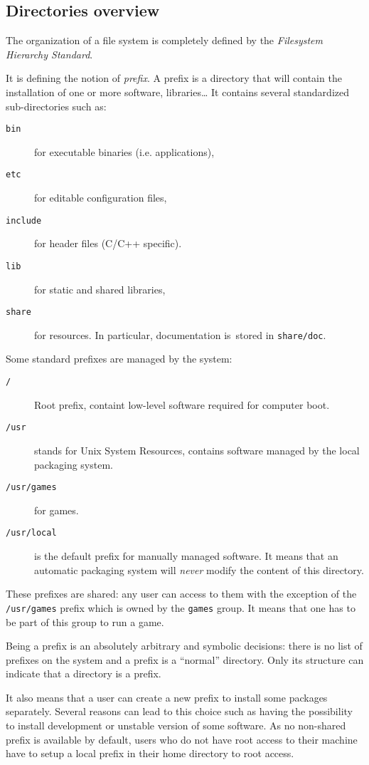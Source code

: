 \subsection{\linux Directories overview}

The organization of a \linux file system is completely defined by the
\emph{Filesystem Hierarchy Standard}.

It is defining the notion of \emph{prefix}. A prefix is a directory
that will contain the installation of one or more software,
libraries\ldots
It contains several standardized sub-directories such as:
\begin{description}
  \item[\texttt{bin}] for executable binaries (i.e. applications),
  \item[\texttt{etc}] for editable configuration files,
  \item[\texttt{include}] for header files (C/C++ specific).
  \item[\texttt{lib}] for static and shared libraries,
  \item[\texttt{share}] for resources. In particular, documentation is\
    stored in \texttt{share/doc}.
\end{description}

Some standard prefixes are managed by the system:
\begin{description}
\item[\texttt{/}] Root prefix, containt low-level software required
  for computer boot.
\item[\texttt{/usr}] stands for Unix System Resources, contains
  software managed by the local packaging system.
\item[\texttt{/usr/games}] for games.
\item[\texttt{/usr/local}] is the default prefix for manually managed
  software. It means that an automatic packaging system will
  \emph{never} modify the content of this directory.
\end{description}

These prefixes are shared: any user can access to them with the
exception of the \texttt{/usr/games} prefix which is owned by the
\texttt{games} group. It means that one has to be part of this group
to run a game.


Being a prefix is an absolutely arbitrary and symbolic decisions:
there is no list of prefixes on the system and a prefix is a
``normal'' directory. Only its structure can indicate that a directory
is a prefix.

It also means that a user can create a new prefix to install some
packages separately. Several reasons can lead to this choice such as
having the possibility to install development or unstable version of
some software. As no non-shared prefix is available by default, users
who do not have root access to their machine have to setup a local
prefix in their home directory to root access.


